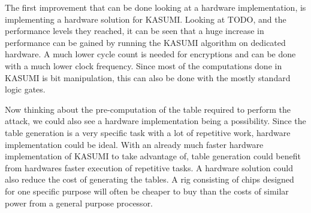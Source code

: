 The first improvement that can be done looking at a hardware
implementation, is implementing a hardware solution for
KASUMI. Looking at \cite{TODO CITE HARDWARE PAPER} TODO, and the
performance levels they reached, it can be seen that a huge increase
in performance can be gained by running the KASUMI algorithm on
dedicated hardware. A much lower cycle count is needed for encryptions
and can be done with a much lower clock frequency. Since most of the
computations done in KASUMI is bit manipulation, this can also be done
with the mostly standard logic gates. 

Now thinking about the pre-computation of the table required to
perform the attack, we could also see a hardware implementation being
a possibility. Since the table generation is a very specific task with
a lot of repetitive work, hardware implementation could be ideal. With
an already much faster hardware implementation of KASUMI to take
advantage of, table generation could benefit from hardwares faster
execution of repetitive tasks. A hardware solution could also reduce
the cost of generating the tables. A rig consisting of chips designed for one specific
purpose will often be cheaper to buy than the costs of similar power
from a general purpose processor.


